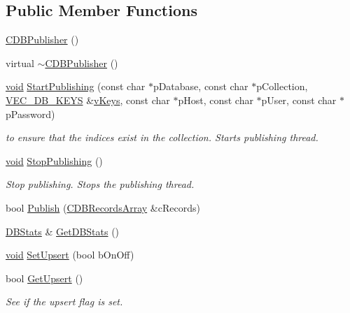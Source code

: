 \subsection*{\-Public \-Member \-Functions}
\begin{DoxyCompactItemize}
\item 
\hyperlink{class_c_d_b_publisher_a9a8efc4caa9c43a26d3cad455c492f4e}{\-C\-D\-B\-Publisher} ()
\item 
virtual \hyperlink{class_c_d_b_publisher_a2d60a06ada8b48aea982b9c57742242a}{$\sim$\-C\-D\-B\-Publisher} ()
\item 
\hyperlink{_cpclient_8h_a6464f7480a0fd0ee170cba12b2c0497f}{void} \hyperlink{class_c_d_b_publisher_a4acf6ea6c628b0387980481a91308d34}{\-Start\-Publishing} (const char $\ast$p\-Database, const char $\ast$p\-Collection, \hyperlink{_c_d_b_publisher_8h_a4663229004d120a06c202e46db5d2d4d}{\-V\-E\-C\-\_\-\-D\-B\-\_\-\-K\-E\-Y\-S} \&\hyperlink{class_c_d_b_publisher_a05607846e2fc5c63010536113ca2534e}{v\-Keys}, const char $\ast$p\-Host, const char $\ast$p\-User, const char $\ast$p\-Password)
\begin{DoxyCompactList}\small\item\em to ensure that the indices exist in the collection. \-Starts publishing thread. \end{DoxyCompactList}\item 
\hyperlink{_cpclient_8h_a6464f7480a0fd0ee170cba12b2c0497f}{void} \hyperlink{class_c_d_b_publisher_abb90cd8717d2e9dbd54773b93656e84d}{\-Stop\-Publishing} ()
\begin{DoxyCompactList}\small\item\em \-Stop publishing. \-Stops the publishing thread. \end{DoxyCompactList}\item 
bool \hyperlink{class_c_d_b_publisher_a8bc747ffa64b62a88b74c760a2a2597c}{\-Publish} (\hyperlink{class_c_d_b_records_array}{\-C\-D\-B\-Records\-Array} \&c\-Records)
\item 
\hyperlink{class_d_b_stats}{\-D\-B\-Stats} \& \hyperlink{class_c_d_b_publisher_a55177dd8e98fae569d4b8c23a79b570e}{\-Get\-D\-B\-Stats} ()
\item 
\hyperlink{_cpclient_8h_a6464f7480a0fd0ee170cba12b2c0497f}{void} \hyperlink{class_c_d_b_publisher_a7591f857cb6edfb1a45e5d27ae1be81b}{\-Set\-Upsert} (bool b\-On\-Off)
\item 
bool \hyperlink{class_c_d_b_publisher_ad9b39dde0e69485ff6ce0ddeb008f127}{\-Get\-Upsert} ()
\begin{DoxyCompactList}\small\item\em \-See if the upsert flag is set. \end{DoxyCompactList}\end{DoxyCompactItemize}
